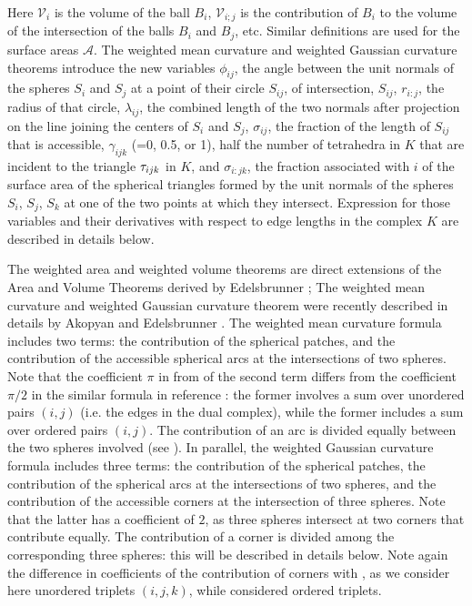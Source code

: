 \documentclass[11 pt]{article}
\newcommand {\mm}[1] {\ifmmode{#1}\else{\mbox{\(#1\)}}\fi}
\theoremstyle{plain} \theorembodyfont{\rmfamily}
\newcommand{\tsx}           {\mm{\tau}}
\begin{document}
Here $\mathcal{V}_i$ is the volume of the ball $B_i$,
$\mathcal{V}_{i;j}$ is the contribution of $B_i$ to the volume of the intersection of the balls $B_i$ and
$B_j$, etc. Similar definitions are used for the surface areas $\mathcal{A}$.  
The weighted mean curvature and weighted Gaussian curvature theorems introduce the new variables $\phi_{ij}$, the angle between the unit normals of the spheres $S_i$ and $S_j$ at a point of their circle $S_{ij}$, of intersection, $S_{ij}$, $r_{i:j}$, the radius of that circle, $\lambda_{ij}$, the combined length of the two normals after projection on the line joining the centers of $S_i$ and $S_j$, $\sigma_{ij}$, the fraction of the length of $S_{ij}$ that is accessible, $\gamma_{ijk}$ (=0, 0.5, or 1), half the number of tetrahedra in $K$ that are incident to the triangle $\tsx_{ijk}$ in $K$, and $\sigma_{i:jk}$, the fraction associated with $i$ of the surface area of the spherical triangles formed by the unit normals of the spheres $S_i$, $S_j$, $S_k$ at one of the two points at which they intersect. Expression for those variables and their derivatives with respect to edge lengths in the complex $K$ are described in details below.

The weighted area and weighted volume theorems are direct extensions of the Area and Volume Theorems derived by Edelsbrunner \cite{Ede95, EdKo05}; 
The weighted mean curvature and weighted Gaussian curvature theorem were recently described in details by Akopyan and Edelsbrunner \cite{AkEd19a, AkEd19b}.
The weighted mean curvature formula includes two terms: the contribution of the spherical patches, and the contribution of the accessible spherical arcs at the intersections of two spheres. Note that the coefficient $\pi$ in from of the second term differs from the coefficient $\pi/2$ in the similar formula in reference \cite{AkEd19a}: the former involves a sum over unordered pairs $(i,j)$ (i.e. the edges in the dual complex), while the former includes a sum over ordered pairs $(i,j)$. The contribution of an arc is divided equally between the two spheres involved (see \cite{AkEd19a}).
In parallel, the weighted Gaussian curvature formula includes three terms: the contribution of the spherical patches, the contribution of the spherical arcs at the intersections of two spheres, and the contribution of the accessible corners at the intersection of three spheres. Note that the latter has a coefficient of $2$, as three spheres intersect at two corners that contribute equally. The contribution of a corner is divided among the corresponding three spheres: this will be described in details below. Note again the difference in coefficients of the contribution of corners with \cite{AkEd19b}, as we consider here unordered triplets $(i,j,k)$, while \cite{AkEd19b} considered ordered triplets.
\end{document}
